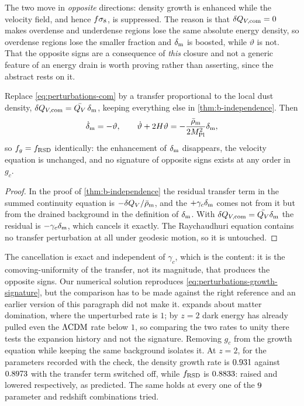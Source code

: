 The two move in \emph{opposite} directions: density growth is enhanced while
the velocity field, and hence $f\sigma_{8}$, is suppressed. The reason is that
$\delta Q_{V,\rm com}=0$ makes overdense and underdense regions lose the same
absolute energy density, so overdense regions lose the smaller fraction and
$\delta_{\rm m}$ is boosted, while $\vartheta$ is not. That the opposite signs
are a consequence of \emph{this} closure and not a generic feature of an
energy drain is worth proving rather than asserting, since the abstract rests
on it.

\begin{proposition}\label{prop:no-signature-from-local-drain}
  Replace \cref{eq:perturbations-com} by a transfer proportional to the local
  dust density, $\delta Q_{V,\rm com}=\bar {Q_{V}}\,\delta_{\rm m}$, keeping
  everything else in \cref{thm:b-independence}. Then
  \begin{equation}\label{eq:perturbations-local-drain}
    \dot\delta_{\rm m}=-\vartheta ,
    \qquad
    \dot\vartheta+2H\vartheta=-\frac{\bar\rho_{\rm m}}{2M_{\mathrm{Pl}}^2}
      \delta_{\rm m} ,
  \end{equation}
  so $f_g=f_{\rm RSD}$ identically: the enhancement of $\delta_{\rm m}$
  disappears, the velocity equation is unchanged, and no signature of opposite
  signs exists at any order in $g_c$.
\end{proposition}

\begin{proof}
  In the proof of \cref{thm:b-independence} the residual transfer term in the
  summed continuity equation is $-\delta Q_{V}/\bar\rho_{\rm m}$, and the
  $+\gamma_c\delta_{\rm m}$ comes not from it but from the drained background
  in the definition of $\delta_{\rm m}$. With
  $\delta Q_{V,\rm com}=\bar {Q_{V}}\delta_{\rm m}$ the residual is
  $-\gamma_c\delta_{\rm m}$, which cancels it exactly. The Raychaudhuri
  equation contains no transfer perturbation at all under geodesic motion, so
  it is untouched.
\end{proof}

The cancellation is exact and independent of $\gamma_c$, which is the content:
it is the comoving-uniformity of the transfer, not its magnitude, that
produces the opposite signs. Our numerical solution reproduces
\cref{eq:perturbations-growth-signature}, but the comparison has to be made
against the right reference and an earlier version of this paragraph did not
make it.  expands about matter
domination, where the unperturbed rate is $1$; by $z=2$ dark energy has already
pulled even the $\Lambda\mathrm{CDM}$ rate below $1$, so comparing the two rates to unity
there tests the expansion history and not the signature. Removing $g_c$ from
the growth equation while keeping the same background isolates it. At $z=2$,
for the parameters recorded with the check, the density growth rate is
$0.931$ against
$0.8973$ with the transfer term switched
off, while $f_{\rm RSD}$ is $0.8833$: raised and lowered
respectively, as predicted. The same holds at every one of the
$9$ parameter and redshift combinations
tried.

